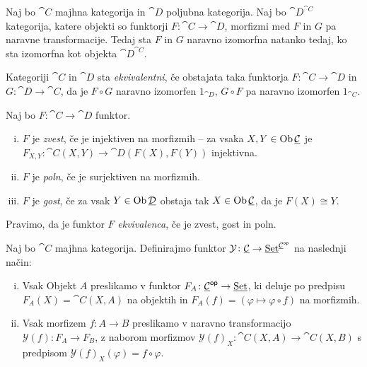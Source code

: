 \begin{opomba}
Naj bo $\cat{C}$ majhna kategorija in $\cat{D}$ poljubna
kategorija. Naj bo $\cat{D}^{\cat{C}}$ kategorija, katere objekti
so funktorji $F \colon \cat{C} \to \cat{D}$, morfizmi med $F$ in
$G$ pa naravne transformacije. Tedaj sta $F$ in $G$ naravno
izomorfna natanko tedaj, ko sta izomorfna kot objekta
$\cat{D}^{\cat{C}}$.
\end{opomba}

\begin{definicija}
Kategoriji $\cat{C}$ in $\cat{D}$ sta
\emph{ekvivalentni}, če obstajata
taka funktorja $F \colon \cat{C} \to \cat{D}$ in
$G \colon \cat{D} \to \cat{C}$, da je $F \circ G$ naravno izomorfen
$1_{\cat{D}}$, $G \circ F$ pa naravno izomorfen $1_{\cat{C}}$.
\end{definicija}

\begin{definicija}
Naj bo $F \colon \cat{C} \to \cat{D}$ funktor.

\begin{enumerate}[i)]
\item $F$ je \emph{zvest}, če je
injektiven na morfizmih -- za vsaka $X, Y \in \operatorname{Ob} \underline{\mathcal{C}}$ je
$F_{X,Y} \colon \cat{C}(X,Y) \to \cat{D}(F(X), F(Y))$ injektivna.
\item $F$ je \emph{poln}, če je surjektiven na morfizmih.
\item $F$ je \emph{gost}, če za vsak $Y \in \operatorname{Ob} \underline{\mathcal{D}}$ obstaja
tak $X \in \operatorname{Ob} \underline{\mathcal{C}}$, da je $F(X) \cong Y$.
\end{enumerate}
\end{definicija} 

\begin{opomba}
Pravimo, da je funktor $F$ \emph{ekvivalenca}, če je zvest, gost in
poln.
\end{opomba}

\begin{definicija}
Naj bo $\cat{C}$ majhna kategorija. Definirajmo funktor
$\mathcal{Y} \colon \underline{\mathcal{C}} \to
\underline{\operatorname{Set}}^{\underline{\mathcal{C}}^{\mathsf{op}}}$ na naslednji
način:

\begin{enumerate}[i)]
\item Vsak Objekt $A$ preslikamo v funktor
$F_A \colon \underline{\mathcal{C}}^{\mathsf{op}} \to \underline{\operatorname{Set}}$,
ki deluje po predpisu $F_A(X) = \cat{C}(X,A)$ na objektih in
$F_A(f) = (\varphi \mapsto \varphi \circ f)$ na morfizmih.
\item Vsak morfizem $f \colon A \to B$ preslikamo v naravno
transformacijo $\mathcal{Y}(f) \colon F_A \to F_B$, z naborom
morfizmov $\mathcal{Y}(f)_X \colon \cat{C}(X, A) \to \cat{C}(X,B)$
s predpisom $\mathcal{Y}(f)_X(\varphi) = f \circ \varphi$.
\end{enumerate}
\end{definicija}

